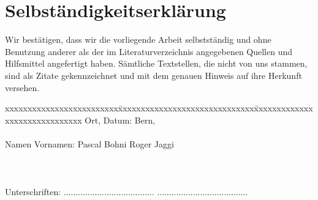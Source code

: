 \chapter*{Selbständigkeitserklärung}
\label{chap:selbstaendigkeitserklaerung}

\vspace*{10mm} 

Wir bestätigen, dass wir die vorliegende Arbeit selbstständig und ohne Benutzung anderer als der im Literaturverzeichnis angegebenen Quellen und Hilfsmittel angefertigt haben. Sämtliche Textstellen, die nicht von uns stammen, sind als Zitate gekennzeichnet und mit dem genauen Hinweis auf ihre Herkunft versehen. 

\vspace{15mm}

\begin{tabbing}
xxxxxxxxxxxxxxxxxxxxxxxxx\=xxxxxxxxxxxxxxxxxxxxxxxxxxxxxx\=xxxxxxxxxxxxxxxxxxxxxxxxxxxxxx\kill
Ort, Datum:		\> Bern, \versiondate \\ \\ 
Namen Vornamen:	\> Pascal Bohni 	\> Roger Jaggi \\ \\ \\ \\ 
Unterschriften:	\> ......................................\> ...................................... \\
\end{tabbing}

